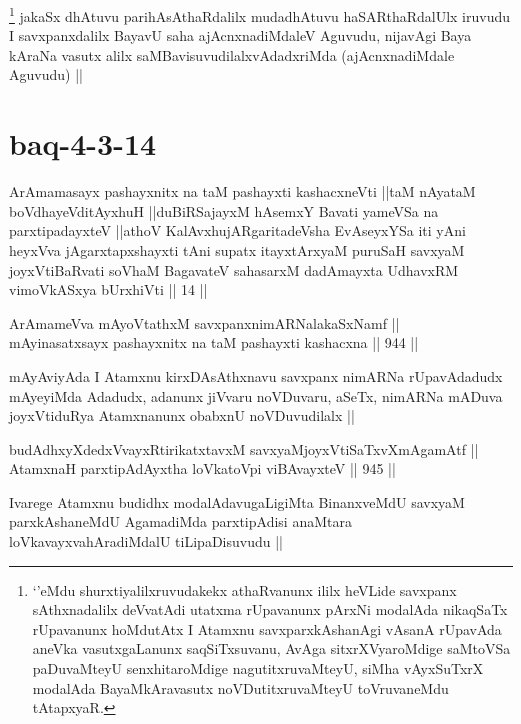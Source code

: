 \begin{artha}
\footnote{`\stext'eMdu shurxtiyalilxruvudakekx athaRvanunx ililx heVLide savxpanx sAthxnadalilx deVvatAdi utatxma rUpavanunx pArxNi modalAda nikaqSaTx rUpavanunx hoMdutAtx I Atamxnu savxparxkAshanAgi vAsanA rUpavAda aneVka vasutxgaLanunx saqSiTxsuvanu, AvAga sitxrXVyaroMdige saMtoVSa paDuvaMteyU senxhitaroMdige nagutitxruvaMteyU, siMha vAyxSuTxrX modalAda BayaMkAravasutx noVDutitxruvaMteyU toVruvaneMdu tAtapxyaR.}
jakaSx dhAtuvu parihAsAthaRdalilx mudadhAtuvu haSARthaRdalUlx iruvudu I savxpanxdalilx BayavU saha ajAcnxnadiMdaleV Aguvudu, nijavAgi Baya kAraNa vasutx alilx saMBavisuvudilalxvAdadxriMda (ajAcnxnadiMdale Aguvudu) ||
\end{artha}

\section*{baq-4-3-14}

\begin{shl}
ArAmamasayx pashayxnitx na taM pashayxti kashacxneVti ||taM nAyataM boVdhayeVditAyxhuH ||duBiRSajayxM hAsemxY Bavati yameVSa na parxtipadayxteV ||athoV KalAvxhujARgaritadeVsha EvAseyxYSa iti yAni heyxVva jAgarxtapxshayxti tAni supatx itayxtArxyaM puruSaH savxyaM joyxVtiBaRvati soV\s haM BagavateV sahasarxM dadAmayxta UdhavxRM vimoVkASxya bUrxhiVti || 14 ||
\end{shl}


\begin{shl}
ArAmameVva mAyoVtathxM savxpanxnimARNalakaSxNamf ||  \\
mAyinasatxsayx pashayxnitx na taM pashayxti kashacxna ||  944 ||  
\end{shl}

\begin{artha}
mAyAviyAda I Atamxnu kirxDAsAthxnavu savxpanx nimARNa rUpavAdadudx mAyeyiMda Adadudx, adanunx jiVvaru noVDuvaru, aSeTx, nimARNa mADuva joyxVtiduRya Atamxnanunx obabxnU noVDuvudilalx ||
\end{artha}

\begin{shl}
budAdhxyXdedxVvayxRtirikatxtavxM savxyaMjoyxVtiSaTxvXmAgamAtf ||  \\
AtamxnaH parxtipAdAyxtha loVkatoV\s pi viBAvayxteV ||  945 ||  
\end{shl}

\begin{artha}
Ivarege Atamxnu budidhx modalAdavugaLigiMta BinanxveMdU savxyaM parxkAshaneMdU AgamadiMda parxtipAdisi anaMtara loVkavayxvahAradiMdalU tiLipaDisuvudu ||
\end{artha}


